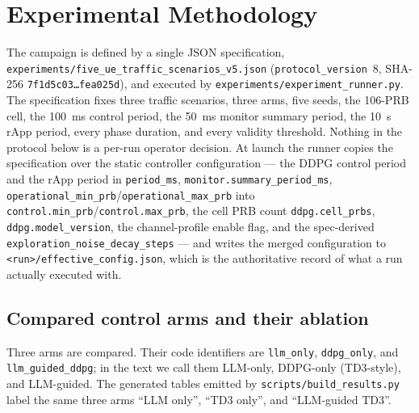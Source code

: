 \section{Experimental Methodology}
\label{sec:methodology}
\label{sec:methodology-anchor}
The campaign is defined by a single JSON specification,
\texttt{experiments/five\_ue\_traffic\_scenarios\_v5.json}
(\texttt{protocol\_version}~8, SHA-256 \texttt{7f1d5c03\ldots fea025d}), and executed by
\texttt{experiments/experiment\_runner.py}. The specification fixes three traffic scenarios,
three arms, five seeds, the 106-PRB cell, the 100~ms control period, the 50~ms monitor
summary period, the 10~s rApp period, every phase duration, and every validity threshold.
Nothing in the protocol below is a per-run operator decision. At launch the runner copies the
specification over the static controller configuration --- the DDPG control period and the
rApp period in \texttt{period\_ms}, \texttt{monitor.summary\_period\_ms},
\texttt{operational\_min\_prb}/\texttt{operational\_max\_prb} into
\texttt{control.min\_prb}/\texttt{control.max\_prb}, the cell PRB count
\texttt{ddpg.cell\_prbs}, \texttt{ddpg.model\_version}, the channel-profile enable flag, and
the spec-derived \texttt{exploration\_noise\_decay\_steps} --- and writes the merged
configuration to \texttt{<run>/effective\_config.json}, which is the authoritative record of
what a run actually executed with.

\subsection{Compared control arms and their ablation}
Three arms are compared. Their code identifiers are \texttt{llm\_only}, \texttt{ddpg\_only},
and \texttt{llm\_guided\_ddpg}; in the text we call them LLM-only, DDPG-only (TD3-style), and
LLM-guided. The generated tables emitted by \texttt{scripts/build\_results.py} label the same
three arms ``LLM only'', ``TD3 only'', and ``LLM-guided TD3''.

